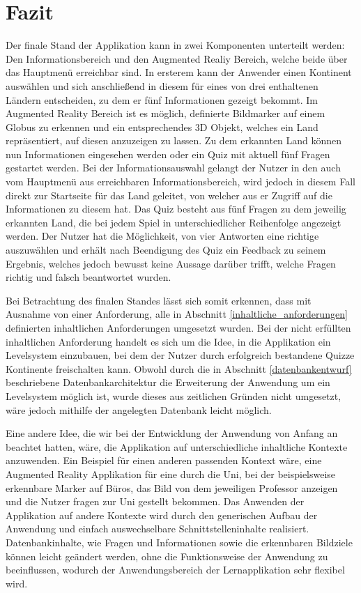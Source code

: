 \chapter{Fazit}\label{ch:fazit}
Der finale Stand der Applikation kann in zwei Komponenten unterteilt werden: Den Informationsbereich und den Augmented Realiy Bereich, welche beide über das Hauptmenü erreichbar sind.
In ersterem kann der Anwender einen Kontinent auswählen und sich anschließend in diesem für eines von drei enthaltenen Ländern entscheiden, zu dem er fünf Informationen gezeigt bekommt.
Im Augmented Reality Bereich ist es möglich, definierte Bildmarker auf einem Globus zu erkennen und ein entsprechendes 3D Objekt, welches ein Land repräsentiert, auf diesen anzuzeigen zu lassen.
Zu dem erkannten Land können nun Informationen eingesehen werden oder ein Quiz mit aktuell fünf Fragen gestartet werden. 
Bei der Informationsauswahl gelangt der Nutzer in den auch vom Hauptmenü aus erreichbaren Informationsbereich, wird jedoch in diesem Fall direkt zur Startseite für das Land geleitet, von welcher aus er Zugriff auf die Informationen zu diesem hat.
Das Quiz besteht aus fünf Fragen zu dem jeweilig erkannten Land, die bei jedem Spiel in unterschiedlicher Reihenfolge angezeigt werden.
Der Nutzer hat die Möglichkeit, von vier Antworten eine richtige auszuwählen und erhält nach Beendigung des Quiz ein Feedback zu seinem Ergebnis, welches jedoch bewusst keine Aussage darüber trifft, welche Fragen richtig und falsch beantwortet wurden.

Bei Betrachtung des finalen Standes lässt sich somit erkennen, dass mit Ausnahme von einer Anforderung, alle in Abschnitt \ref{inhaltliche_anforderungen} definierten inhaltlichen Anforderungen umgesetzt wurden.
Bei der nicht erfüllten inhaltlichen Anforderung handelt es sich um die Idee, in die Applikation ein Levelsystem einzubauen, bei dem der Nutzer durch erfolgreich bestandene Quizze Kontinente freischalten kann.
Obwohl durch die in Abschnitt \ref{datenbankentwurf} beschriebene Datenbankarchitektur die Erweiterung der Anwendung um ein Levelsystem möglich ist, wurde dieses aus zeitlichen Gründen nicht umgesetzt, wäre jedoch mithilfe der angelegten Datenbank leicht möglich.

Eine andere Idee, die wir bei der Entwicklung der Anwendung von Anfang an beachtet hatten, wäre, die Applikation auf unterschiedliche inhaltliche Kontexte anzuwenden.
Ein Beispiel für einen anderen passenden Kontext wäre, eine Augmented Reality Applikation für eine  durch die Uni, bei der beispielsweise erkennbare Marker auf Büros, das Bild von dem jeweiligen Professor anzeigen und die Nutzer fragen zur Uni gestellt bekommen.
Das Anwenden der Applikation auf andere Kontexte wird durch den generischen Aufbau der Anwendung und einfach auswechselbare Schnittstelleninhalte realisiert.
Datenbankinhalte, wie Fragen und Informationen sowie die erkennbaren Bildziele können leicht geändert werden, ohne die Funktionsweise der Anwendung zu beeinflussen, wodurch der Anwendungsbereich der Lernapplikation sehr flexibel wird.

